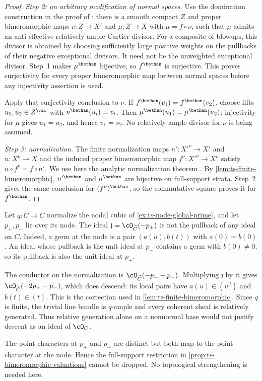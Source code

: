 \begin{proof}
\emph{Step 2: an arbitrary modification of normal spaces.}
Use the domination construction in the proof of
\cite[Proposition~2.1.6, pp.~13--14]{MPTropicalV2}: there is a smooth
compact $Z$ and proper bimeromorphic maps
$\nu:Z\to X'$ and $\mu:Z\to X$ with $\mu=f\circ\nu$, such that
$\mu$ admits an anti-effective relatively ample Cartier divisor.
For a composite of blowups, this divisor is obtained by choosing
sufficiently large positive weights on the pullbacks of their negative
exceptional divisors. It need not be the unweighted exceptional divisor.
Step~1 makes $\mu^\bethan$ bijective, so $f^\bethan$ is surjective.
This proves surjectivity for every proper bimeromorphic map between
normal spaces before any injectivity assertion is used.

Apply that surjectivity conclusion to $\nu$. If
$f^\bethan(v_1)=f^\bethan(v_2)$, choose lifts $u_1,u_2\in Z^{\val}$
with $\nu^\bethan(u_i)=v_i$. Then
$\mu^\bethan(u_1)=\mu^\bethan(u_2)$; injectivity for $\mu$ gives
$u_1=u_2$, and hence $v_1=v_2$. No relatively ample divisor for
$\nu$ is being assumed.

\emph{Step 3: normalization.}
The finite normalization maps $n':X'^\nu\to X'$ and
$n:X^\nu\to X$ and the induced proper bimeromorphic map
$f^\nu:X'^\nu\to X^\nu$ satisfy $n\circ f^\nu=f\circ n'$.
We use here the analytic normalization theorem
\cite[Chapter~8]{CAS}. By \cref{lem:ts-finite-bimeromorphic},
$n'^\bethan$ and $n^\bethan$ are bijective on full-support strata.
Step~2 gives the same conclusion for $(f^\nu)^\bethan$, so the
commutative square proves it for $f^\bethan$.
\end{proof}

\begin{example}\label{ex:ts-nodal-ideal-descent}
Let $q:\widetilde C\to C$ normalize the nodal cubic of
\cref{ex:ts-node-global-prime}, and let $p_+,p_-$ lie over its node.
The ideal $\mathfrak j=\cO_{\widetilde C}(-p_+)$ is not the pullback
of any ideal on $C$. Indeed, a germ at the node is a pair
$(a(u),b(t))$ with $a(0)=b(0)$. An ideal whose pullback is the unit
ideal at $p_-$ contains a germ with $b(0)\ne0$, so its pullback is
also the unit ideal at $p_+$.

The conductor on the normalization is
$\cO_{\widetilde C}(-p_+-p_-)$. Multiplying $\mathfrak j$ by it gives
$\cO_{\widetilde C}(-2p_+-p_-)$, which does descend: its local pairs
have $a(u)\in(u^2)$ and $b(t)\in(t)$. This is the correction used in
\cref{lem:ts-finite-bimeromorphic}. Since $q$ is finite, the trivial
line bundle is $q$-ample and every coherent sheaf is relatively
generated. Thus relative generation alone on a nonnormal base would
not justify descent as an ideal of $\cO_C$.

The point characters at $p_+$ and $p_-$ are distinct but both map to
the point character at the node. Hence the full-support restriction
in \cref{prop:ts-bimeromorphic-valuations} cannot be dropped. No
topological strengthening is needed here.
\end{example}

